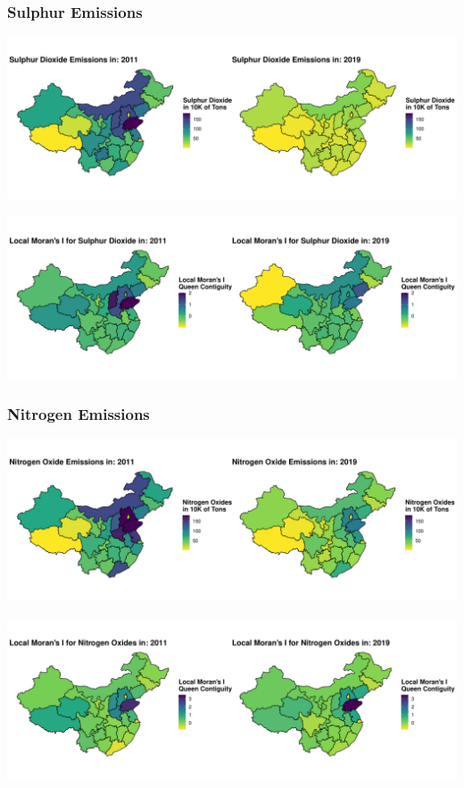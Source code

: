 \documentclass[
]{article}
\begin{document}
	\subsubsection{Sulphur Emissions}
		\begin{center}
		\includegraphics[width = 440pt]{Waste_Gas_Emissions_Sulphur_comp.pdf}
	\end{center}
	\begin{center}
		\includegraphics[width = 440pt]{Ii_Waste_Gas_Emissions_Sulphur_comp.pdf}
	\end{center}
	\subsubsection{Nitrogen Emissions}
		\begin{center}
		\includegraphics[width = 440pt]{Waste_Gas_Emissions_Nitrogen_comp.pdf}
	\end{center}
	\begin{center}
		\includegraphics[width = 440pt]{Ii_Waste_Gas_Emissions_Nitrogen_comp.pdf}
	\end{center}
\end{document}
